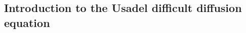 \documentclass[b5paper,twoside,openright]{scrbook}
\begin{document}
\subsection{Introduction to the Usadel difficult diffusion equation}
%
%
%
\end{document}
